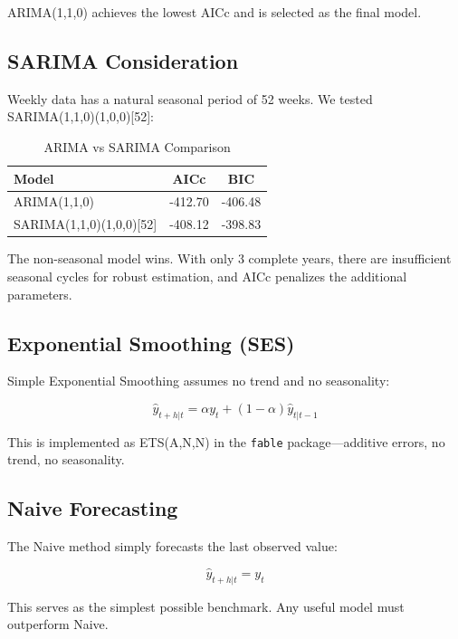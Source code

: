 \documentclass[12pt]{article}
\begin{document}
ARIMA(1,1,0) achieves the lowest AICc and is selected as the final model.

\subsection{SARIMA Consideration}

Weekly data has a natural seasonal period of 52 weeks. We tested SARIMA(1,1,0)(1,0,0)[52]:

\begin{table}[H]
\centering
\caption{ARIMA vs SARIMA Comparison}
\begin{tabular}{lcc}
\toprule
\textbf{Model} & \textbf{AICc} & \textbf{BIC} \\
\midrule
ARIMA(1,1,0) & -412.70 & -406.48 \\
SARIMA(1,1,0)(1,0,0)[52] & -408.12 & -398.83 \\
\bottomrule
\end{tabular}
\end{table}

The non-seasonal model wins. With only 3 complete years, there are insufficient seasonal cycles for robust estimation, and AICc penalizes the additional parameters.

\subsection{Exponential Smoothing (SES)}

Simple Exponential Smoothing assumes no trend and no seasonality:

\begin{equation}
\hat{y}_{t+h|t} = \alpha y_t + (1-\alpha)\hat{y}_{t|t-1}
\end{equation}

This is implemented as ETS(A,N,N) in the \texttt{fable} package---additive errors, no trend, no seasonality.

\subsection{Naive Forecasting}

The Naive method simply forecasts the last observed value:

\begin{equation}
\hat{y}_{t+h|t} = y_t
\end{equation}

This serves as the simplest possible benchmark. Any useful model must outperform Naive.
\end{document}
